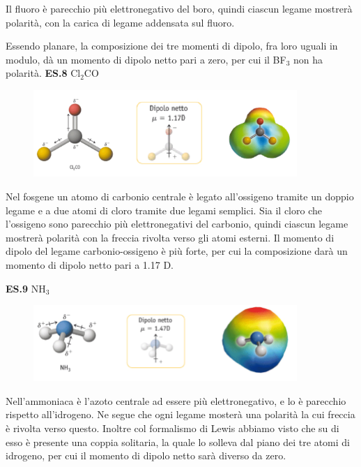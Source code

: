 Il fluoro è parecchio più elettronegativo del boro, quindi ciascun legame mostrerà polarità, con la carica di legame addensata sul fluoro.

Essendo planare, la composizione dei tre momenti di dipolo, fra loro uguali in modulo, dà un momento di dipolo netto pari a zero, per cui il BF$_3$ non ha polarità. 
\newpage
\vspace{0.2cm}\textbf{ES.8} Cl$_2$CO

\vspace{-0.3cm}\begin{figure}[htp]
    \centering
    \includegraphics[width=10cm]{immagini/Cl_2CO.png}
\end{figure}

\vspace{-0.3cm}Nel fosgene un atomo di carbonio centrale è legato all'ossigeno tramite un doppio legame e a due atomi di cloro tramite due legami semplici. Sia il cloro che l'ossigeno sono parecchio più elettronegativi del carbonio, quindi ciascun legame mostrerà polarità con la freccia rivolta verso gli atomi esterni. Il momento di dipolo del legame carbonio-ossigeno è più forte, per cui la composizione darà un momento di dipolo netto pari a 1.17 D.

\vspace{0.2cm}\textbf{ES.9} NH$_3$

\vspace{-0.3cm}\begin{figure}[htp]
    \centering
    \includegraphics[width=10cm]{immagini/NH_3.png}
\end{figure}

\vspace{-0.3cm}Nell'ammoniaca è l'azoto centrale ad essere più elettronegativo, e lo è parecchio rispetto all'idrogeno. Ne segue che ogni legame mosterà una polarità la cui freccia è rivolta verso questo. Inoltre col formalismo di Lewis abbiamo visto che su di esso è presente una coppia solitaria, la quale lo solleva dal piano dei tre atomi di idrogeno, per cui il momento di dipolo netto sarà diverso da zero.

